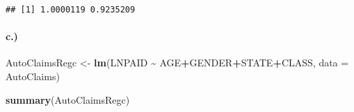 \documentclass[
]{article}
\newenvironment{Shaded}{\begin{snugshade}}{\end{snugshade}}
\newcommand{\AttributeTok}[1]{\textcolor[rgb]{0.13,0.29,0.53}{#1}}
\newcommand{\FunctionTok}[1]{\textcolor[rgb]{0.13,0.29,0.53}{\textbf{#1}}}
\newcommand{\NormalTok}[1]{#1}
\newcommand{\OtherTok}[1]{\textcolor[rgb]{0.56,0.35,0.01}{#1}}
\newcommand{\SpecialCharTok}[1]{\textcolor[rgb]{0.81,0.36,0.00}{\textbf{#1}}}
\begin{document}
\begin{verbatim}
## [1] 1.0000119 0.9235209
\end{verbatim}

\paragraph{c.)}\label{c.}

\begin{Shaded}
\begin{Highlighting}[]
\NormalTok{AutoClaimsRegc }\OtherTok{\textless{}{-}} \FunctionTok{lm}\NormalTok{(LNPAID }\SpecialCharTok{\textasciitilde{}}\NormalTok{ AGE}\SpecialCharTok{+}\NormalTok{GENDER}\SpecialCharTok{+}\NormalTok{STATE}\SpecialCharTok{+}\NormalTok{CLASS, }\AttributeTok{data =}\NormalTok{ AutoClaims)}

\FunctionTok{summary}\NormalTok{(AutoClaimsRegc)}
\end{Highlighting}
\end{Shaded}
\end{document}
